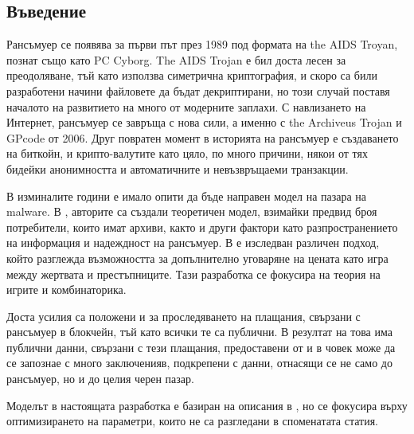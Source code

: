 \documentclass[11pt, a4paper]{article}
\theoremstyle{definition}
\begin{document}
		\subsection{Въведение}
			Рансъмуер се появява за първи път през 1989 под формата на the AIDS Troyan, познат също като PC Cyborg.  The AIDS Trojan е бил доста лесен за преодоляване, тъй като използва симетрична криптография, и скоро са били разработени начини файловете да бъдат декриптирани, но този случай поставя началото на развитието на много от модерните заплахи. С навлизането на Интернет, рансъмуер се завръща с нова сили, а именно с the Archiveus Trojan и GPcode от 2006. Друг повратен момент в историята на рансъмуер е създаването на биткойн, и крипто-валутите като цяло, по много причини, някои от тях бидейки анонимността и автоматичните и невъзвръщаеми транзакции\cite{huang2018tracking}.\par
			В изминалите години е имало опити да бъде направен модел на пазара на malware. В \cite{caulfielddynamic}, авторите са създали теоретичен модел, взимайки предвид броя потребители, които имат архиви, както и други фактори като разпространението на информация и надеждност на рансъмуер.           
			В \cite{cartwright2018pay} е изследван различен подход, който разглежда възможността за допълнително уговаряне на цената като игра между жертвата и престъпниците. Тази разработка се фокусира на теория на игрите и комбинаторика.\par
			Доста усилия са положени и за проследяването на плащания, свързани с рансъмуер в блокчейн, тъй като всички те са публични. В резултат на това има публични данни, свързани с тези плащания, предоставени от \cite{paquet2019ransomware} и в \cite{thomas2015framing} човек може да се запознае с много заключенияв, подкрепени с данни, отнасящи се не само до рансъмуер, но и до целия черен пазар.\par
			Моделът в настоящата разработка е базиран на описания в \cite{caulfielddynamic}, но се фокусира върху оптимизирането на параметри, които не са разгледани в споменатата статия.
\end{document}

